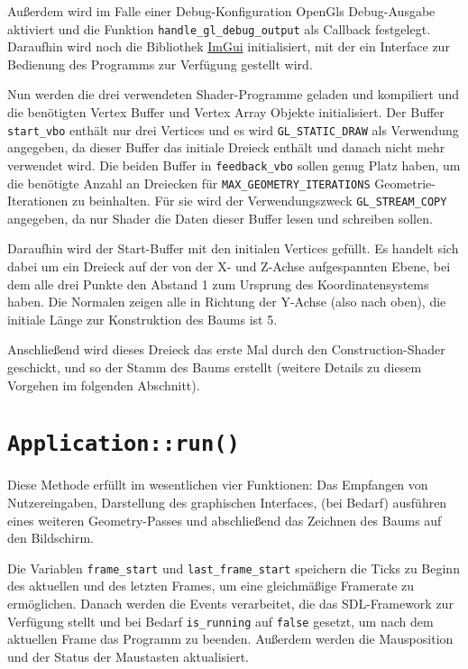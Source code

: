 Außerdem wird im Falle einer Debug-Konfiguration OpenGls Debug-Ausgabe aktiviert und die Funktion \lstinline{handle_gl_debug_output} als Callback festgelegt. Daraufhin wird noch die Bibliothek \href{https://github.com/ocornut/imgui}{ImGui} initialisiert, mit der ein Interface zur Bedienung des Programms zur Verfügung gestellt wird.

Nun werden die drei verwendeten Shader-Programme geladen und kompiliert und die benötigten Vertex Buffer und Vertex Array Objekte initialisiert. Der Buffer \lstinline{start_vbo} enthält nur drei Vertices und es wird \lstinline{GL_STATIC_DRAW} als Verwendung angegeben, da dieser Buffer das initiale Dreieck enthält und danach nicht mehr verwendet wird. Die beiden Buffer in \lstinline{feedback_vbo} sollen genug Platz haben, um die benötigte Anzahl an Dreiecken für \lstinline{MAX_GEOMETRY_ITERATIONS} Geometrie-Iterationen zu beinhalten. Für sie wird der Verwendungszweck \lstinline{GL_STREAM_COPY} angegeben, da nur Shader die Daten dieser Buffer lesen und schreiben sollen.

Daraufhin wird der Start-Buffer mit den initialen Vertices gefüllt. Es handelt sich dabei um ein Dreieck auf der von der X- und Z-Achse aufgespannten Ebene, bei dem alle drei Punkte den Abstand 1 zum Ursprung des Koordinatensystems haben. Die Normalen zeigen alle in Richtung der Y-Achse (also nach oben), die initiale Länge zur Konstruktion des Baums ist 5.

Anschließend wird dieses Dreieck das erste Mal durch den Construction-Shader geschickt, und so der Stamm des Baums erstellt (weitere Details zu diesem Vorgehen im folgenden Abschnitt). 

\section{\lstinline{Application::run()}}
Diese Methode erfüllt im wesentlichen vier Funktionen: Das Empfangen von Nutzereingaben, Darstellung des graphischen Interfaces, (bei Bedarf) ausführen eines weiteren Geometry-Passes und abschließend das Zeichnen des Baums auf den Bildschirm. 

Die Variablen \lstinline{frame_start} und \lstinline{last_frame_start} speichern die Ticks zu Beginn des aktuellen und des letzten Frames, um eine gleichmäßige Framerate zu ermöglichen. Danach werden die Events verarbeitet, die das SDL-Framework zur Verfügung stellt und bei Bedarf \lstinline{is_running} auf \lstinline{false} gesetzt, um nach dem aktuellen Frame das Programm zu beenden. Außerdem werden die Mausposition und der Status der Maustasten aktualisiert. 

